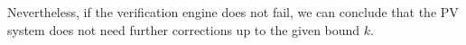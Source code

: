 \documentclass[review]{elsarticle}
\begin{document}
Nevertheless, if the verification engine does not fail, we can conclude that the PV system does not need further corrections up to the given bound $k$.
%
\end{document}
